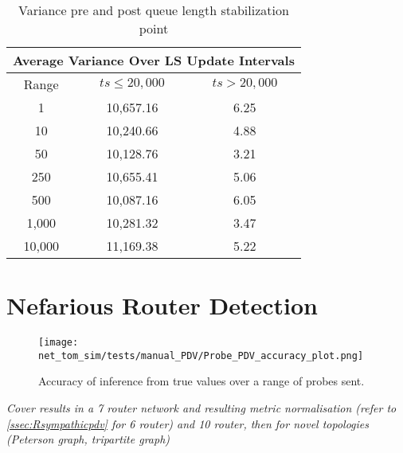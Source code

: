 \begin{table}[H]
    \centering
    \begin{tabular}{||c c c||}
        \hline
        \multicolumn{3}{||c||}{Average Variance Over LS Update Intervals} \\ [0.5ex]
        \hline
        \multicolumn{1}{||c|}{Range} & $ts \leq 20,000$ & $ts > 20,000$ \\ [0.5ex]
        \hline\hline
        1       & 10,657.16 & 6.25 \\ 
        10      & 10,240.66 & 4.88 \\
        50      & 10,128.76 & 3.21 \\
        250     & 10,655.41 & 5.06 \\
        500     & 10,087.16 & 6.05 \\
        1,000   & 10,281.32 & 3.47 \\
        10,000  & 11,169.38 & 5.22 \\ [1ex] 
        \hline
    \end{tabular}
    \caption{Variance pre and post queue length stabilization point}
\end{table}
\section{Nefarious Router Detection}
\label{sec:Rnefarouterdetection}
\begin{figure}[H]
        \centering
        \texttt{[image: net\_tom\_sim/tests/manual\_PDV/Probe\_PDV\_accuracy\_plot.png]}
        \caption{Accuracy of inference from true values over a range of probes sent.}
        \label{fig:Rqstabilization}
\end{figure}
\emph{Cover results in a 7 router network and resulting metric normalisation (refer to \cref{ssec:Rsympathicpdv} for 6 router) and 10 router, then for novel topologies (Peterson graph, tripartite graph)}

